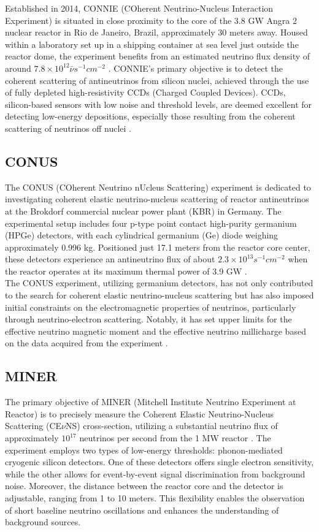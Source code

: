 Established in 2014, CONNIE (COherent Neutrino-Nucleus Interaction Experiment) is situated in close proximity to the core of the 3.8 GW Angra 2 nuclear reactor in Rio de Janeiro, Brazil, approximately 30 meters away. Housed within a laboratory set up in a shipping container at sea level just outside the reactor dome, the experiment benefits from an estimated neutrino flux density of around $7.8\times10^{12}\bar{\nu}s^{-1}cm^{-2}$ \cite{Nasteva_2021}. CONNIE's primary objective is to detect the coherent scattering of antineutrinos from silicon nuclei, achieved through the use of fully depleted high-resistivity CCDs (Charged Coupled Devices). CCDs, silicon-based sensors with low noise and threshold levels, are deemed excellent for detecting low-energy depositions, especially those resulting from the coherent scattering of neutrinos off nuclei \cite{Fernandez_Moroni_2015}.

\subsection{CONUS}

The CONUS (COherent Neutrino nUcleus Scattering) experiment is dedicated to investigating coherent elastic neutrino-nucleus scattering of reactor antineutrinos at the Brokdorf commercial nuclear power plant (KBR) in Germany. The experimental setup includes four p-type point contact high-purity germanium (HPGe) detectors, with each cylindrical germanium (Ge) diode weighing approximately 0.996 kg. Positioned just 17.1 meters from the reactor core center, these detectors experience an antineutrino flux of about $2.3\times10^{13}s^{-1}cm^{-2}$ when the reactor operates at its maximum thermal power of 3.9 GW \cite{Bonet_2021}.\\
The CONUS experiment, utilizing germanium detectors, has not only contributed to the search for coherent elastic neutrino-nucleus scattering but has also imposed initial constraints on the electromagnetic properties of neutrinos, particularly through neutrino-electron scattering. Notably, it has set upper limits for the effective neutrino magnetic moment and the effective neutrino millicharge based on the data acquired from the experiment \cite{Elect}.  

\subsection{MINER}

The primary objective of MINER (Mitchell Institute Neutrino Experiment at Reactor) is to precisely measure the Coherent Elastic Neutrino-Nucleus Scattering (CE$\nu$NS) cross-section, utilizing a substantial neutrino flux of approximately $10^{17}$ neutrinos per second from the 1 MW reactor \cite{Miner}. The experiment employs two types of low-energy thresholds: phonon-mediated cryogenic silicon detectors. One of these detectors offers single electron sensitivity, while the other allows for event-by-event signal discrimination from background noise. Moreover, the distance between the reactor core and the detector is adjustable, ranging from 1 to 10 meters. This flexibility enables the observation of short baseline neutrino oscillations and enhances the understanding of background sources.

